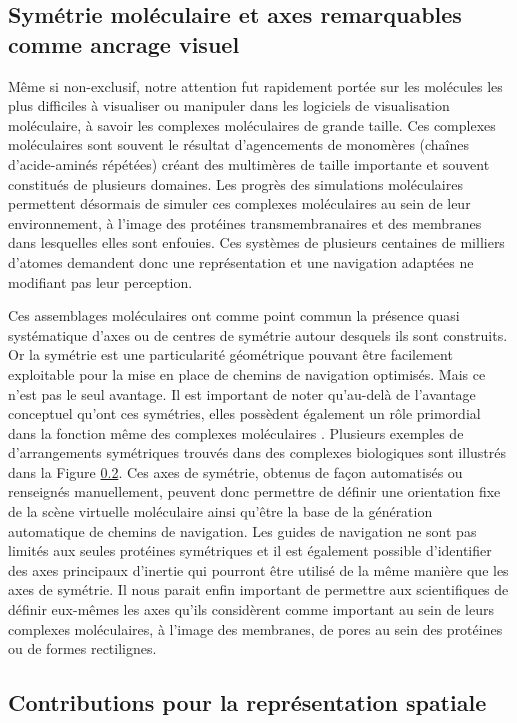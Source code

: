 \subsection{Symétrie moléculaire et axes remarquables comme ancrage visuel}

Même si non-exclusif, notre attention fut rapidement portée sur les molécules les plus difficiles à visualiser ou manipuler dans les logiciels de visualisation moléculaire, à savoir les complexes moléculaires de grande taille. Ces complexes moléculaires sont souvent le résultat d'agencements de monomères (chaînes d'acide-aminés répétées) créant des multimères de taille importante et souvent constitués de plusieurs domaines. Les progrès des simulations moléculaires permettent désormais de simuler ces complexes moléculaires au sein de leur environnement, à l'image des protéines transmembranaires et des membranes dans lesquelles elles sont enfouies. Ces systèmes de plusieurs centaines de milliers d'atomes demandent donc une représentation et une navigation adaptées ne modifiant pas leur perception.

Ces assemblages moléculaires ont comme point commun la présence quasi systématique d'axes ou de centres de symétrie autour desquels ils sont construits. Or la symétrie est une particularité géométrique pouvant être facilement exploitable pour la mise en place de chemins de navigation optimisés. Mais ce n'est pas le seul avantage. Il est important de noter qu'au-delà de l'avantage conceptuel qu'ont ces symétries, elles possèdent également un rôle primordial dans la fonction même des complexes moléculaires \cite{goodsell_structural_2000}. Plusieurs exemples de d'arrangements symétriques trouvés dans des complexes biologiques sont illustrés dans la Figure \ref{}.
Ces axes de symétrie, obtenus de façon automatisés ou renseignés manuellement, peuvent donc permettre de définir une orientation fixe de la scène virtuelle moléculaire ainsi qu'être la base de la génération automatique de chemins de navigation. Les guides de navigation ne sont pas limités aux seules protéines symétriques et il est également possible d'identifier des axes principaux d'inertie qui pourront être utilisé de la même manière que les axes de symétrie. Il nous parait enfin important de permettre aux scientifiques de définir eux-mêmes les axes qu'ils considèrent comme important au sein de leurs complexes moléculaires, à l'image des membranes, de pores au sein des protéines ou de formes rectilignes.

\subsection{Contributions pour la représentation spatiale}

